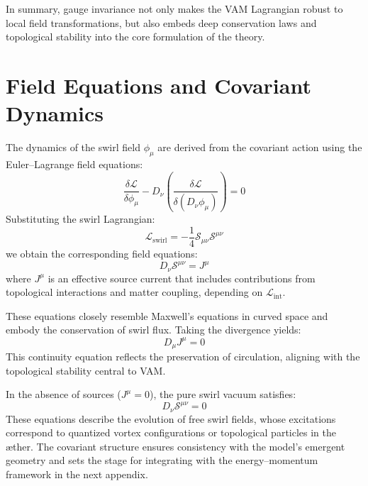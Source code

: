 In summary, gauge invariance not only makes the VAM Lagrangian robust to local field transformations, but also embeds deep conservation laws and topological stability into the core formulation of the theory.


\section{Field Equations and Covariant Dynamics}
The dynamics of the swirl field $\phi_\mu$ are derived from the covariant action using the Euler–Lagrange field equations:
\begin{equation}
    \frac{\delta \mathcal{L}}{\delta \phi_\mu} - D_\nu \left( \frac{\delta \mathcal{L}}{\delta (D_\nu \phi_\mu)} \right) = 0
\end{equation}
Substituting the swirl Lagrangian:
\begin{equation}
    \mathcal{L}_{\text{swirl}} = -\frac{1}{4} \mathcal{S}_{\mu\nu} \mathcal{S}^{\mu\nu}
\end{equation}
we obtain the corresponding field equations:
\begin{equation}
    D_\nu \mathcal{S}^{\mu\nu} = J^\mu
\end{equation}
where $J^\mu$ is an effective source current that includes contributions from topological interactions and matter coupling, depending on $\mathcal{L}_{\text{int}}$.

These equations closely resemble Maxwell's equations in curved space and embody the conservation of swirl flux. Taking the divergence yields:
\begin{equation}
    D_\mu J^\mu = 0
\end{equation}
This continuity equation reflects the preservation of circulation, aligning with the topological stability central to VAM.

In the absence of sources ($J^\mu = 0$), the pure swirl vacuum satisfies:
\begin{equation}
    D_\nu \mathcal{S}^{\mu\nu} = 0
\end{equation}
These equations describe the evolution of free swirl fields, whose excitations correspond to quantized vortex configurations or topological particles in the æther. The covariant structure ensures consistency with the model's emergent geometry and sets the stage for integrating with the energy–momentum framework in the next appendix.


